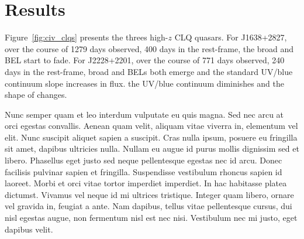 \documentclass[a4paper,fleqn,usenatbib]{mnras}
\begin{document}
\begin{figure*}
  \centering
  \includegraphics[width=16.7cm, trim=0.0cm 0.1cm 0.2cm 0.1cm, clip]
  {../plots/perObject/J1205+3422_landscape_20190920.png}
  \includegraphics[width=16.7cm, trim=0.0cm 0.1cm 0.2cm 0.1cm, clip]
  {../plots/perObject/J1638+2827_landscape_20190920.png}
  \includegraphics[width=16.7cm, trim=0.0cm 0.1cm 0.2cm 0.1cm, clip]
  {../plots/perObject/J2228+2201_landscape_20190920.png}
  \vspace{-12pt}
  \caption[]{The threes high-$z$ CLQ quasars; 
    SDSS J1205+3422 (top), 
    SDSS J1638+2827 (middle), 
    SDSS J2228+2201 (bottom). 
  }
  \label{fig:civ_clqs}
\end{figure*}
\section{Results}
Figure~\ref{fig:civ_clqs} presents the threes high-$z$ CLQ quasars. 
For J1638+2827, over the course of 1279 days observed, 400 days in the rest-frame, the  broad \civ and \ciii BEL start to fade.  
For J2228+2201, over the course of 771 days observed, 240 days in the rest-frame, broad \civ and \ciii BELs both emerge and the 
standard UV/blue continuum slope increases in flux. 
the UV/blue continuum diminishes and the shape of \lya changes. 

Nunc semper quam et leo interdum vulputate eu quis magna. Sed nec arcu
at orci egestas convallis. Aenean quam velit, aliquam vitae viverra
in, elementum vel elit. Nunc suscipit aliquet sapien a suscipit. Cras
nulla ipsum, posuere eu fringilla sit amet, dapibus ultricies
nulla. Nullam eu augue id purus mollis dignissim sed et
libero. Phasellus eget justo sed neque pellentesque egestas nec id
arcu. Donec facilisis pulvinar sapien et fringilla. Suspendisse
vestibulum rhoncus sapien id laoreet. Morbi et orci vitae tortor
imperdiet imperdiet. In hac habitasse platea dictumst. Vivamus vel
neque id mi ultrices tristique. Integer quam libero, ornare vel
gravida in, feugiat a ante. Nam dapibus, tellus vitae pellentesque
cursus, dui nisl egestas augue, non fermentum nisl est nec
nisi. Vestibulum nec mi justo, eget dapibus velit.
\end{document}
